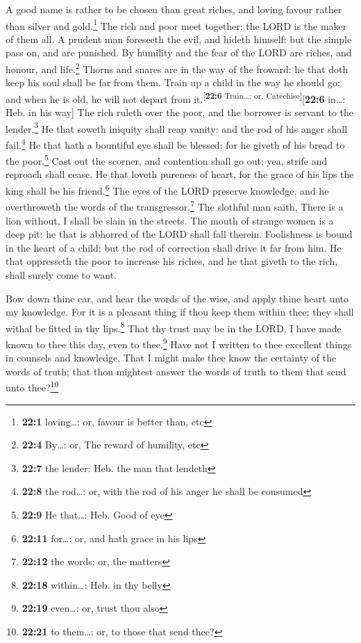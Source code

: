  A good name is rather to be chosen than great riches, and
loving favour rather than silver and gold.\footnote{\textbf{22:1}
  loving\ldots: or, favour is better than, etc}  The rich
and poor meet together: the LORD is the maker of them all.
 A prudent man foreseeth the evil, and hideth himself: but
the simple pass on, and are punished.  By humility and the
fear of the LORD are riches, and honour, and life.\footnote{\textbf{22:4}
  By\ldots: or, The reward of humility, etc}  Thorns and
snares are in the way of the froward: he that doth keep his soul shall
be far from them.  Train up a child in the way he should
go: and when he is old, he will not depart from
it.\textsuperscript{{[}\textbf{22:6} Train\ldots: or,
Catechise{]}}{[}\textbf{22:6} in\ldots: Heb. in his way{]}
 The rich ruleth over the poor, and the borrower is
servant to the lender.\footnote{\textbf{22:7} the lender: Heb. the man
  that lendeth}  He that soweth iniquity shall reap
vanity: and the rod of his anger shall fail.\footnote{\textbf{22:8} the
  rod\ldots: or, with the rod of his anger he shall be consumed}
 He that hath a bountiful eye shall be blessed; for he
giveth of his bread to the poor.\footnote{\textbf{22:9} He that\ldots:
  Heb. Good of eye}  Cast out the scorner, and contention
shall go out; yea, strife and reproach shall cease.  He
that loveth pureness of heart, for the grace of his lips the king shall
be his friend.\footnote{\textbf{22:11} for\ldots: or, and hath grace in
  his lips}  The eyes of the LORD preserve knowledge, and
he overthroweth the words of the transgressor.\footnote{\textbf{22:12}
  the words: or, the matters}  The slothful man saith,
There is a lion without, I shall be slain in the streets.
 The mouth of strange women is a deep pit: he that is
abhorred of the LORD shall fall therein.  Foolishness is
bound in the heart of a child; but the rod of correction shall drive it
far from him.  He that oppresseth the poor to increase
his riches, and he that giveth to the rich, shall surely come to want.

 Bow down thine ear, and hear the words of the wise, and
apply thine heart unto my knowledge.  For it is a
pleasant thing if thou keep them within thee; they shall withal be
fitted in thy lips.\footnote{\textbf{22:18} within\ldots: Heb. in thy
  belly}  That thy trust may be in the LORD, I have made
known to thee this day, even to thee.\footnote{\textbf{22:19}
  even\ldots: or, trust thou also}  Have not I written to
thee excellent things in counsels and knowledge,  That I
might make thee know the certainty of the words of truth; that thou
mightest answer the words of truth to them that send unto
thee?\footnote{\textbf{22:21} to them\ldots: or, to those that send
  thee?}

